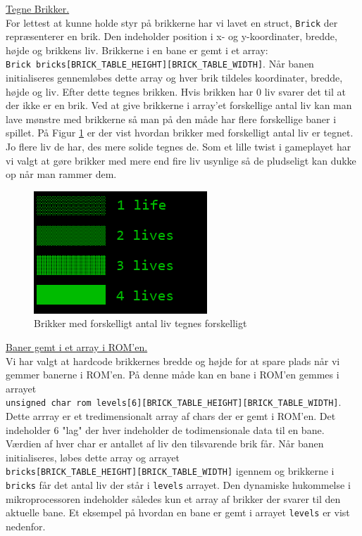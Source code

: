 \underline{Tegne Brikker.}\\

For lettest at kunne holde styr på brikkerne har vi lavet en struct, \texttt{Brick} der repræsenterer en brik. Den indeholder position i x- og y-koordinater, bredde, højde og brikkens liv. Brikkerne i en bane er gemt i et array:\\ \texttt{Brick bricks[BRICK\_TABLE\_HEIGHT][BRICK\_TABLE\_WIDTH]}. Når banen initialiseres gennemløbes dette array og hver brik tildeles koordinater, bredde, højde og liv. Efter dette tegnes brikken. Hvis brikken har 0 liv svarer det til at der ikke er en brik. Ved at give brikkerne i array'et forskellige antal liv kan man lave mønstre med brikkerne så man på den måde har flere forskellige baner i spillet. På Figur \ref{fig:brikker} er der vist hvordan brikker med forskelligt antal liv er tegnet. Jo flere liv de har, des mere solide tegnes de. Som et lille twist i gameplayet har vi valgt at gøre brikker med mere end fire liv usynlige så de pludseligt kan dukke op når man rammer dem.

\begin{figure}[h!]
\centering
\includegraphics[scale=1]{figs/brikker.png}
\caption{Brikker med forskelligt antal liv tegnes forskelligt}
\label{fig:brikker}
\end{figure}


\underline{Baner gemt i et array i ROM'en.}\\

Vi har valgt at hardcode brikkernes bredde og højde for at spare plads når vi gemmer banerne i ROM'en. På denne måde kan en bane i ROM'en gemmes i arrayet\\ \texttt{unsigned char rom levels[6][BRICK\_TABLE\_HEIGHT][BRICK\_TABLE\_WIDTH]}. Dette arrray er et tredimensionalt array af chars der er gemt i ROM'en. Det indeholder 6 "lag" der hver indeholder de todimensionale data til en bane. Værdien af hver char er antallet af liv den tilsvarende brik får. Når banen initialiseres, løbes dette array og arrayet\\ \texttt{bricks[BRICK\_TABLE\_HEIGHT][BRICK\_TABLE\_WIDTH]} igennem og brikkerne i \texttt{bricks} får det antal liv der står i \texttt{levels} arrayet. Den dynamiske hukommelse i mikroprocessoren indeholder således kun et array af brikker der svarer til den aktuelle bane. Et eksempel på hvordan en bane er gemt i arrayet \texttt{levels} er vist nedenfor.

